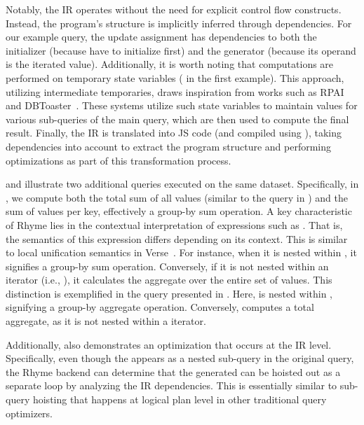 \documentclass[runningheads]{llncs}
\newcommand{\lang}{Rhyme}
\begin{document}
Notably, the IR operates without the need for explicit control flow constructs.
Instead, the program's structure is implicitly inferred through dependencies.
For our example query, the update assignment  has dependencies to
both the initializer (because have to initialize first) and the generator
(because its operand is the iterated value).
Additionally, it is worth noting that computations are performed on temporary
state variables ( in the first example).
This approach, utilizing intermediate temporaries, draws inspiration from works
such as RPAI~\cite{rpai} and DBToaster~\cite{dbtoaster_vldb}.
These systems utilize such state variables to maintain values for
various sub-queries of the main query, which are then used to compute the
final result.
Finally, the IR is translated into JS code (and compiled using ),
taking dependencies into account to extract the program structure and performing
optimizations as part of this transformation process.

 and  illustrate two additional queries executed on
the same dataset.
Specifically, in , we compute both the total sum of all values
(similar to the query in ) and the sum of values per key, effectively
a group-by sum operation.
A key characteristic of \lang{} lies in the contextual interpretation of expressions
such as .
That is, the semantics of this expression differs depending on its context.
This is similar to local unification semantics in Verse~\cite{verse}.
For instance, when it is nested within ,
it signifies a group-by sum operation.
Conversely, if it is not nested within an iterator (i.e., \inline{*}),
it calculates the aggregate over the entire set of values.
This distinction is exemplified in the query presented in .
Here,  is nested within , signifying a
group-by aggregate operation.
Conversely,  computes a total aggregate, as it is not nested
within a  iterator.

Additionally,  also demonstrates an optimization that occurs at the IR level.
Specifically, even though the  appears as a nested sub-query
in the original query, the \lang{} backend can determine that the generated
 can be hoisted out as a separate loop by analyzing the IR dependencies.
This is essentially similar to sub-query hoisting that happens at logical plan level
in other traditional query optimizers.
\end{document}
